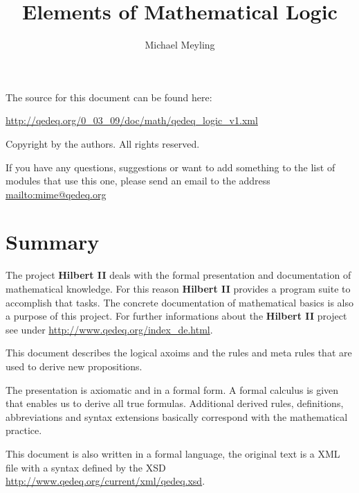 \documentclass[a4paper,german,10pt,twoside]{book}
\title{Elements of Mathematical Logic}
\author{
Michael Meyling
}
\theoremstyle{definition}
\theoremstyle{remark}
\begin{document}
\maketitle

\setlength{\parskip}{5pt plus 2pt minus 1pt}
\mbox{}
\vfill

\par
The source for this document can be found here:
\par
\url{http://qedeq.org/0_03_09/doc/math/qedeq_logic_v1.xml}

\par
Copyright by the authors. All rights reserved.
\par
If you have any questions, suggestions or want to add something to the list of modules that use this one, please send an email to the address \url{mailto:mime@qedeq.org}

\setlength{\parskip}{0pt}
\tableofcontents

\setlength{\parskip}{5pt plus 2pt minus 1pt}

\chapter*{Summary} \label{chapter0} \hypertarget{chapter0}{}

The project \textbf{Hilbert II} deals with the formal presentation and documentation of mathematical knowledge. For this reason \textbf{Hilbert II} provides a program suite to accomplish that tasks. The concrete documentation of mathematical basics is also a purpose of this project.   
For further informations about the \textbf{Hilbert II} project see under \url{http://www.qedeq.org/index_de.html}.

\par
This document describes the logical axoims and the rules and meta rules that are used to derive new propositions.

\par
The presentation is axiomatic and in a formal form. A formal calculus is given that enables us to derive all true formulas. Additional derived rules, definitions, abbreviations and syntax extensions basically correspond with the mathematical practice.

\par
This document is also written in a formal language, the original text is a XML file with a syntax defined by the XSD \url{http://www.qedeq.org/current/xml/qedeq.xsd}.
\end{document}
